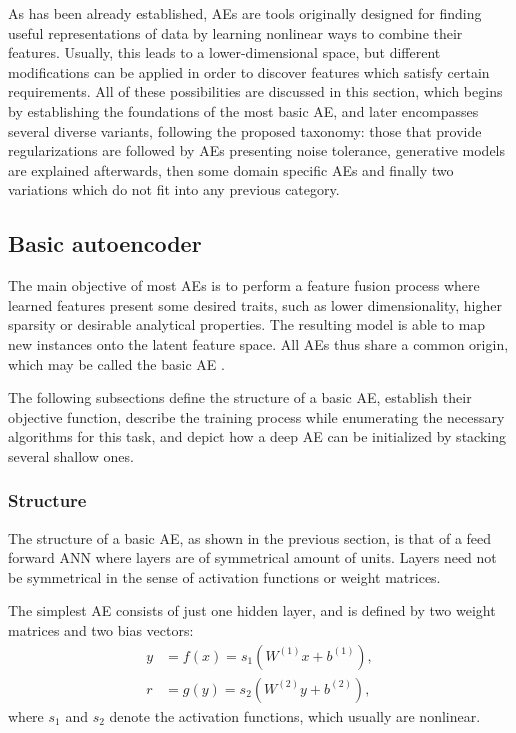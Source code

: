 As has been already established, AEs are tools originally designed for finding useful representations of data by learning nonlinear ways to combine their features. Usually, this leads to a lower-dimensional space, but different modifications can be applied in order to discover features which satisfy certain requirements. All of these possibilities are discussed in this section, which begins by establishing the foundations of the most basic AE, and later encompasses several diverse variants, following the proposed taxonomy: those that provide regularizations are followed by AEs presenting noise tolerance, generative models are explained afterwards, then some domain specific AEs and finally two variations which do not fit into any previous category.

\subsection{Basic autoencoder}\label{p1Sec.BasicAE}

The main objective of most AEs is to perform a feature fusion process where learned features present some desired traits, such as lower dimensionality, higher sparsity or desirable analytical properties. The resulting model is able to map new instances onto the latent feature space. All AEs thus share a common origin, which may be called the basic AE .

The following subsections define the structure of a basic AE, establish their objective function, describe the training process while enumerating the necessary algorithms for this task, and depict how a deep AE can be initialized by stacking several shallow ones.


\subsubsection{Structure}

The structure of a basic AE, as shown in the previous section, is that of a feed forward ANN where layers are of symmetrical amount of units. Layers need not be symmetrical in the sense of activation functions or weight matrices.

The simplest AE consists of just one hidden layer, and is defined by two weight matrices and two bias vectors:
\begin{align}
  y&=f(x)=s_1(W^{(1)}x+b^{(1)}),\\
  r&=g(y)=s_2(W^{(2)}y+b^{(2)}),
\end{align}
where $s_1$ and $s_2$ denote the activation functions, which usually are nonlinear.

